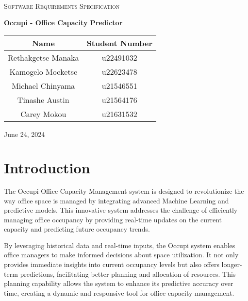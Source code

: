 \documentclass[11pt,a4paper]{article}
\begin{document}
\begin{titlepage}
    \centering
    {\scshape\LARGE Software Requirements Specification\par}
    \vspace{1.5cm}
    {\huge\bfseries Occupi - Office Capacity Predictor\par}
    \vspace{2.5cm}
    \begin{tabular}{|c|c|}
        \hline
        \textbf{Name}      & \textbf{Student Number} \\
        \hline
        Rethakgetse Manaka & u22491032               \\
        Kamogelo Moeketse  & u22623478               \\
        Michael Chinyama   & u21546551               \\
        Tinashe Austin     & u21564176               \\
        Carey Mokou        & u21631532               \\
        \hline
    \end{tabular}
    \vfill
    {\large June 24, 2024\par}
\end{titlepage}

\tableofcontents
\pagebreak


\section*{Introduction}
The Occupi-Office Capacity Management system is designed to revolutionize the way office space is managed by integrating advanced Machine Learning and predictive models. This innovative system addresses the challenge of efficiently managing office occupancy by providing real-time updates on the current capacity and predicting future occupancy trends.

By leveraging historical data and real-time inputs, the Occupi system enables office managers to make informed decisions about space utilization. It not only provides immediate insights into current occupancy levels but also offers longer-term predictions, facilitating better planning and allocation of resources. This planning capability allows the system to enhance its predictive accuracy over time, creating a dynamic and responsive tool for office capacity management.
\end{document}

